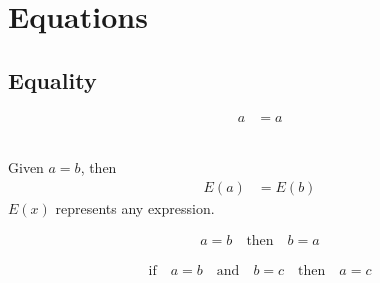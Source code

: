 \documentclass[20150903-160354-rs2.2-MarksMathNotebook.tex]{subfiles}
\begin{document}
%
%


\chapter{Equations}


\section{Equality}

\begin{property}
\begin{subequations}
\begin{align}
a &= a \label{eq:rpe}
\end{align}
\end{subequations}
\end{property}

\begin{property} \hfill \\

Given $a=b$, then
\begin{align}
E(a) &= E(b) \label{eq:spe}
\end{align}
$E(x)$ represents any expression.
\end{property}

\begin{property}
\begin{subequations}
\begin{align}
a =b \quad \text{then} \quad b=a \label{eq:sype}
\end{align}
\end{subequations}
\end{property}

\begin{property}
\begin{subequations}
\begin{align}
\text{if} \quad a =b \quad \text{and} \quad b=c \quad \text{then} \quad a =c \label{eq:tpe}
\end{align}
\end{subequations}
\end{property}
\end{document}
